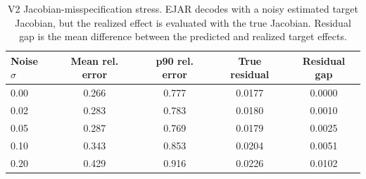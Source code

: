 \begin{table}[t]
\centering
\caption{V2 Jacobian-misspecification stress. EJAR decodes with a noisy estimated target Jacobian, but the realized effect is evaluated with the true Jacobian. Residual gap is the mean difference between the predicted and realized target effects.}
\label{tab:jacobian-stress}
\begin{tabular}{lcccc}
\toprule
Noise $\sigma$ & Mean rel. error & p90 rel. error & True residual & Residual gap \\
\midrule
0.00 & 0.266 & 0.777 & 0.0177 & 0.0000 \\
0.02 & 0.283 & 0.783 & 0.0180 & 0.0010 \\
0.05 & 0.287 & 0.769 & 0.0179 & 0.0025 \\
0.10 & 0.343 & 0.853 & 0.0204 & 0.0051 \\
0.20 & 0.429 & 0.916 & 0.0226 & 0.0102 \\
\bottomrule
\end{tabular}
\end{table}
